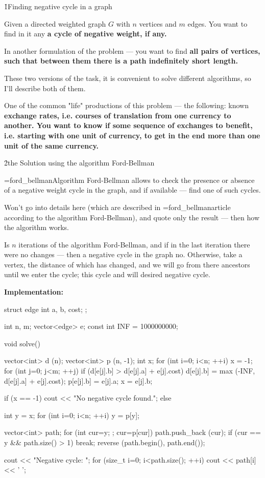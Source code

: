 \h1{Finding negative cycle in a graph}

Given a directed weighted graph $G$ with $n$ vertices and $m$ edges. You want to find in it any \bf{a cycle of negative weight}, if any.

In another formulation of the problem --- you want to find \bf{all pairs of vertices}, such that between them there is a path indefinitely short length.

These two versions of the task, it is convenient to solve different algorithms, so I'll describe both of them.

One of the common "life" productions of this problem --- the following: known \bf{exchange rates}, i.e. courses of translation from one currency to another. You want to know if some sequence of exchanges to benefit, i.e. starting with one unit of currency, to get in the end more than one unit of the same currency.


\h2{the Solution using the algorithm Ford-Bellman}

\algohref=ford_bellman{Algorithm Ford-Bellman} allows to check the presence or absence of a negative weight cycle in the graph, and if available --- find one of such cycles.

Won't go into details here (which are described in \algohref=ford_bellman{article according to the algorithm Ford-Bellman}), and quote only the result --- then how the algorithm works.

Is $n$ iterations of the algorithm Ford-Bellman, and if in the last iteration there were no changes --- then a negative cycle in the graph no. Otherwise, take a vertex, the distance of which has changed, and we will go from there ancestors until we enter the cycle; this cycle and will desired negative cycle.

\bf{Implementation}:

\code
struct edge {
int a, b, cost;
};

int n, m;
vector<edge> e;
const int INF = 1000000000;

void solve() {
vector<int> d (n);
vector<int> p (n, -1);
int x;
for (int i=0; i<n; ++i) {
x = -1;
for (int j=0; j<m; ++j)
if (d[e[j].b] > d[e[j].a] + e[j].cost) {
d[e[j].b] = max (-INF, d[e[j].a] + e[j].cost);
p[e[j].b] = e[j].a;
x = e[j].b;
}
}

if (x == -1)
cout << "No negative cycle found.";
else {
int y = x;
for (int i=0; i<n; ++i)
y = p[y];

vector<int> path;
for (int cur=y; ; cur=p[cur]) {
path.push_back (cur);
if (cur == y && path.size() > 1) break;
}
reverse (path.begin(), path.end());

cout << "Negative cycle: ";
for (size_t i=0; i<path.size(); ++i)
cout << path[i] << ' ';
}
}
\endcode



